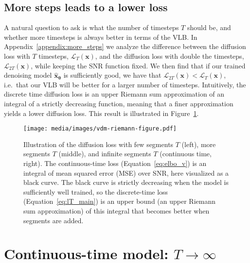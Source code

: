 \documentclass{article}
\def\Eqref#1{Equation~\ref{#1}}
\def\rvx{{\mathbf{x}}}
\newcommand{\bT}{{\boldsymbol{\theta}}}
\newcommand{\lT}{\mathcal{L}_T(\rvx)}
\newcommand{\ldT}{\mathcal{L}_{2T}(\rvx)}
\begin{document}
\subsection{More steps leads to a lower loss}
\label{sec:moresteps}
A natural question to ask is what the number of timesteps $T$ should be, and whether more timesteps is always better in terms of the VLB. In Appendix~\ref{appendix:more_steps} we analyze the difference between the diffusion loss with $T$ timesteps, $\lT$, and the diffusion loss with double the timesteps, $\ldT$, while keeping the SNR function fixed. 
We then find that if our trained denoising model $\hat{\rvx}_{\bT}$ is sufficiently good, we have that $\ldT < \lT$, i.e.\ that our VLB will be better for a larger number of timesteps. Intuitively, the discrete time diffusion loss is an upper Riemann sum  approximation of an integral of a strictly decreasing function, meaning that a finer approximation yields a lower diffusion loss. This result is illustrated in Figure~\ref{fig:more_steps_is_better}.
\begin{figure}[t]
\texttt{[image: media/images/vdm-riemann-figure.pdf]}
  \caption{
Illustration of the diffusion loss with few segments $T$ (left), more segments $T$ (middle), and infinite segments $T$ (continuous time, right). The continuous-time loss (\Eqref{eq:elbo_v}) is an integral of mean squared error (MSE) over SNR, here visualized as a black curve. The black curve is strictly decreasing when the model is sufficiently well trained, so the discrete-time loss (\Eqref{eq:lT_main}) is an upper bound (an upper Riemann sum approximation) of this integral that becomes better when segments are added.}
  \label{fig:more_steps_is_better}
\end{figure}

\section{Continuous-time model: $T\rightarrow\infty$}
\end{document}
